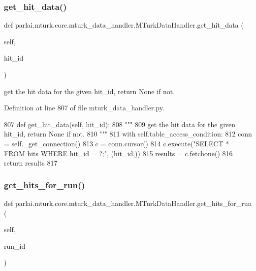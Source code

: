 \subsubsection{\texorpdfstring{get\+\_\+hit\+\_\+data()}{get\_hit\_data()}}
{\footnotesize\ttfamily def parlai.\+mturk.\+core.\+mturk\+\_\+data\+\_\+handler.\+M\+Turk\+Data\+Handler.\+get\+\_\+hit\+\_\+data (\begin{DoxyParamCaption}\item[{}]{self,  }\item[{}]{hit\+\_\+id }\end{DoxyParamCaption})}

\begin{DoxyVerb}get the hit data for the given hit_id, return None if not.
\end{DoxyVerb}
 

Definition at line 807 of file mturk\+\_\+data\+\_\+handler.\+py.


\begin{DoxyCode}
807     \textcolor{keyword}{def }get\_hit\_data(self, hit\_id):
808         \textcolor{stringliteral}{"""}
809 \textcolor{stringliteral}{        get the hit data for the given hit\_id, return None if not.}
810 \textcolor{stringliteral}{        """}
811         with self.table\_access\_condition:
812             conn = self.\_get\_connection()
813             c = conn.cursor()
814             c.execute(\textcolor{stringliteral}{"SELECT * FROM hits WHERE hit\_id = ?;"}, (hit\_id,))
815             results = c.fetchone()
816             \textcolor{keywordflow}{return} results
817 
\end{DoxyCode}
\mbox{\label{classparlai_1_1mturk_1_1core_1_1mturk__data__handler_1_1MTurkDataHandler_a9f4e9c9bec7d5d47efd4492dfb751b5c}} 
\subsubsection{\texorpdfstring{get\+\_\+hits\+\_\+for\+\_\+run()}{get\_hits\_for\_run()}}
{\footnotesize\ttfamily def parlai.\+mturk.\+core.\+mturk\+\_\+data\+\_\+handler.\+M\+Turk\+Data\+Handler.\+get\+\_\+hits\+\_\+for\+\_\+run (\begin{DoxyParamCaption}\item[{}]{self,  }\item[{}]{run\+\_\+id }\end{DoxyParamCaption})}

